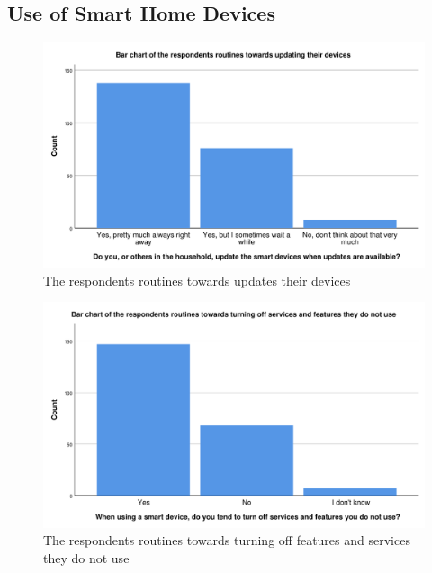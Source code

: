 \subsection{Use of Smart Home Devices}

\begin{figure}[H]
    \centering
    \includegraphics[scale=0.55]{figures/diagrams/update.pdf}
    \caption{The respondents routines towards updates their devices}
    \label{fig:update}
\end{figure}



\begin{figure}[H]
    \centering
    \includegraphics[scale=0.55]{figures/diagrams/turn_off_features.pdf}
    \caption{The respondents routines towards turning off features and services they do not use}
    \label{fig:turn_off_features}
\end{figure}

